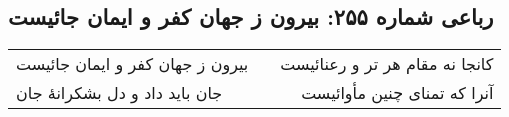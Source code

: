 \begin{center}
\section*{رباعی شماره ۲۵۵: بیرون ز جهان کفر و ایمان جائیست}
\label{sec:0255}
\begin{longtable}{l p{0.5cm} r}
بیرون ز جهان کفر و ایمان جائیست
&&
کانجا نه مقام هر تر و رعنائیست
\\
جان باید داد و دل بشکرانهٔ جان
&&
آنرا که تمنای چنین مأوائیست
\\
\end{longtable}
\end{center}
